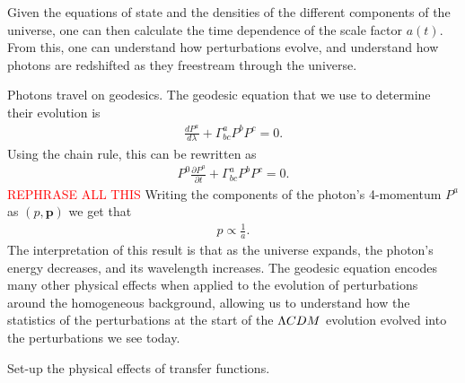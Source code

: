     Given the equations of state and the densities of the different
    components of the universe, one can then calculate the time dependence of the
    scale factor $a(t)$. From this, one can understand how perturbations evolve, and understand
    how photons are redshifted as they freestream through the universe.


    Photons travel on geodesics. The geodesic equation that we use to determine
    their evolution is
    \begin{align}
        \frac{dP^a}{d\lambda}+\Gamma^a_{bc}P^bP^c=0.
    \end{align}
    Using the chain rule, this can be rewritten as
    \begin{align}
        P^{0}\frac{\partial P^a}{\partial t}+\Gamma^a_{bc}P^bP^c=0.
    \end{align}
    \textcolor{red}{REPHRASE ALL THIS}
    Writing the components of the photon's 4-momentum $P^a$
    as $(p, \mathbf{p})$ we get that
    \begin{align}
        p\propto \frac{1}{a}.
    \end{align}
    The interpretation of this result is that as the universe expands,
    the photon's energy decreases, and its wavelength increases.
    The geodesic equation encodes many other physical effects when applied
    to the evolution of perturbations around the homogeneous background,
    allowing us to understand how the statistics of the perturbations at the
    start of the $\Lambda CDM$ evolution evolved into the perturbations we see today.


    Set-up the physical effects of transfer functions.

